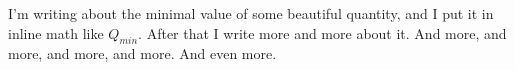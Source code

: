 I'm writing about the minimal value of some beautiful quantity, and
I put it in inline math like $Q_{min}$. After that I write more and more %
about it. And more, and more, and more, and more. And even more.
